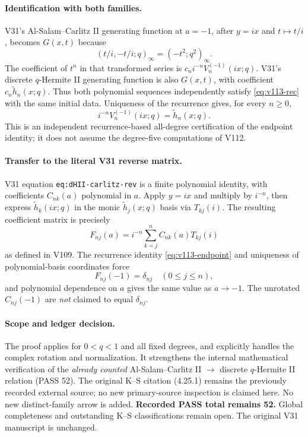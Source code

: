 \documentclass[11pt]{article}
\begin{document}
\paragraph{Identification with both families.}
V31's Al-Salam--Carlitz II generating function at $a=-1$, after $y=ix$ and $t\mapsto t/i$, becomes $G(x,t)$ because
\[
 (t/i,-t/i;q)_\infty=(-t^2;q^2)_\infty.
\]
The coefficient of $t^n$ in that transformed series is
$c_n i^{-n}V_n^{(-1)}(ix;q)$. V31's discrete $q$-Hermite II generating function is also $G(x,t)$, with coefficient $c_n\widetilde h_n(x;q)$. Thus both polynomial sequences independently satisfy \eqref{eq:v113-rec} with the same initial data. Uniqueness of the recurrence gives, for every $n\ge0$,
\begin{equation}\label{eq:v113-endpoint}
 \boxed{i^{-n}V_n^{(-1)}(ix;q)=\widetilde h_n(x;q).}
\end{equation}
This is an independent recurrence-based all-degree certification of the endpoint identity; it does not assume the degree-five computations of V112.

\paragraph{Transfer to the literal V31 reverse matrix.}
V31 equation \texttt{eq:dHII-carlitz-rev} is a finite polynomial identity, with coefficients $C_{nk}(a)$ polynomial in $a$. Apply $y=ix$ and multiply by $i^{-n}$, then express $\widetilde h_k(ix;q)$ in the monic $\widetilde h_j(x;q)$ basis via $T_{kj}(i)$. The resulting coefficient matrix is precisely
\[
 F_{nj}(a)=i^{-n}\sum_{k=j}^{n}C_{nk}(a)T_{kj}(i)
\]
as defined in V109. The recurrence identity \eqref{eq:v113-endpoint} and uniqueness of polynomial-basis coordinates force
\[
 \boxed{F_{nj}(-1)=\delta_{nj}\quad(0\le j\le n),}
\]
and polynomial dependence on $a$ gives the same value as $a\to-1$. The unrotated $C_{nj}(-1)$ are \emph{not} claimed to equal $\delta_{nj}$.

\paragraph{Scope and ledger decision.}
The proof applies for $0<q<1$ and all fixed degrees, and explicitly handles the complex rotation and normalization. It strengthens the internal mathematical verification of the \emph{already counted} Al-Salam--Carlitz II $\to$ discrete $q$-Hermite II relation (PASS 52). The original K--S citation (4.25.1) remains the previously recorded external source; no new primary-source inspection is claimed here. No new distinct-family arrow is added. \textbf{Recorded PASS total remains 52.} Global completeness and outstanding K--S classifications remain open. The original V31 manuscript is unchanged.
\end{document}
